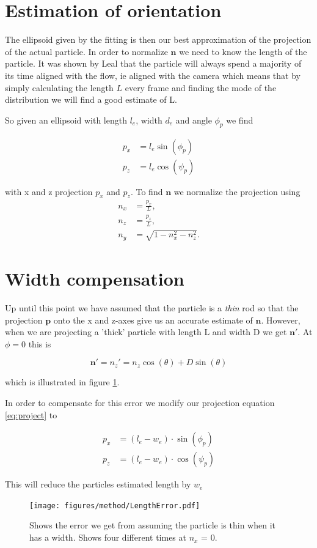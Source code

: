 \section{Estimation of orientation}

The ellipsoid given by the fitting is then our best approximation of the projection of the actual particle. In order to normalize $\mathbf{n}$ we need to know the length of the particle. It was shown by Leal \cite{Leal} that the particle will always spend a majority of its time aligned with the flow, ie aligned with the camera which means that by simply calculating the length $L$ every frame and finding the mode of the distribution we will find a good estimate of L. 

So given an ellipsoid with length $l_e$, width $d_e$ and angle $\phi_p$ we find 

\begin{align} \label{eq:project}
p_x  &= l_e \sin(\phi_p) \\
p_z  &= l_e \cos(\psi_p) 
\end{align}

with x and z projection $p_x$ and $p_z$. To find $\mathbf{n}$ we normalize the projection using
\begin{subequations}\label{eq:normalize}
\begin{align}
n_x 	&= \frac{p_x}{L}, \\
n_z 	&= \frac{p_z}{L}, \\
n_y		&= \sqrt{1 - n_x^2 - n_z^2}.
\end{align}
\end{subequations}


\section{Width compensation}\label{sec:width_compensation}
Up until this point we have assumed that the particle is a \emph{thin} rod so that the projection $\mathbf{p}$ onto the x and z-axes give us an accurate estimate of $\mathbf{n}$. However, when we are projecting a 'thick' particle with length L and width D we get $\mathbf{n}'$. At $\phi = 0$ this is

\begin{equation}
\mathbf{n}' = n_z' = n_z\cos(\theta)  + D\sin(\theta) 
\end{equation}

which is illustrated in figure \ref{fig:lengtherror}. 

In order to compensate for this error we modify our projection equation \ref{eq:project} to

\begin{align}\label{eq:widthCompensation}
p_x  &= (l_e - w_e)\cdot \sin(\phi_p) \\
p_z  &= (l_e - w_e)\cdot \cos(\psi_p) 
\end{align}

This will reduce the particles estimated length by $w_e$
\begin{figure}[H]
\centering
\texttt{[image: figures/method/LengthError.pdf]}
\caption{Shows the error we get from assuming the particle is thin when it has a width. Shows four different times at $n_x$ = 0. }\label{fig:lengtherror}
\end{figure} 

